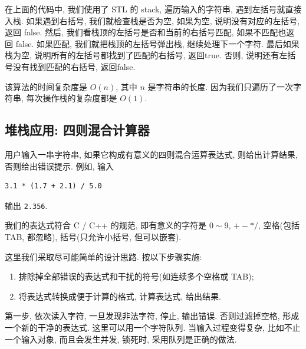 \documentclass[a4paper]{ctexart}
\theoremstyle{definition}
\theoremstyle{definition}
\begin{document}
在上面的代码中, 我们使用了 STL 的 stack, 遍历输入的字符串, 遇到左括号就直接入栈. 
如果遇到右括号, 我们就检查栈是否为空, 如果为空, 说明没有对应的左括号, 返回 false. 
然后, 我们看栈顶的左括号是否和当前的右括号匹配, 如果不匹配也返回 false. 如果匹配, 
我们就把栈顶的左括号弹出栈, 继续处理下一个字符. 最后如果栈为空, 
说明所有的左括号都找到了匹配的右括号, 返回true. 否则, 说明还有左括号没有找到匹配的右括号, 
返回false. 

该算法的时间复杂度是 $O(n)$, 其中 $n$ 是字符串的长度. 因为我们只遍历了一次字符串, 
每次操作栈的复杂度都是 $O(1)$.

\subsection{堆栈应用: 四则混合计算器}

用户输入一串字符串, 如果它构成有意义的四则混合运算表达式, 则给出计算结果, 
否则给出错误提示. 例如, 输入
\begin{verbatim}
3.1 * (1.7 + 2.1) / 5.0
\end{verbatim}
输出 \verb|2.356|. 

我们的表达式符合 C / C++ 的规范, 即有意义的字符是 $0 \sim 9$, $+ - *
/$, 空格(包括 TAB, 都忽略), 括号(只允许小括号, 但可以嵌套).

这里我们采取尽可能简单的设计思路. 按以下步骤实施:

\begin{enumerate}
\item 排除掉全部错误的表达式和干扰的符号(如连续多个空格或 TAB);
\item 将表达式转换成便于计算的格式, 计算表达式, 给出结果.
\end{enumerate}

第一步, 依次读入字符, 一旦发现非法字符, 停止, 输出错误. 否则过滤掉空格,
形成一个新的干净的表达式. 这里可以用一个字符队列. 当输入过程变得复杂,
比如不止一个输入对象, 而且会发生并发, 锁死时, 采用队列是正确的做法.
\end{document}
